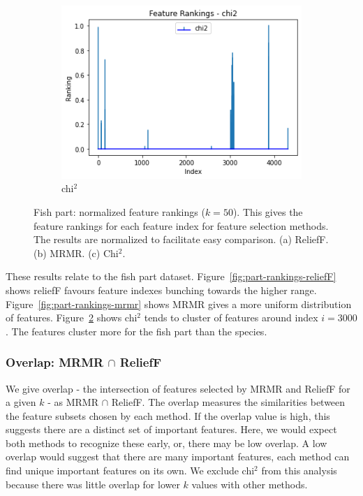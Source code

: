 \documentclass{article}
\begin{document}
\begin{figure}[htb]
  \begin{subfigure}[b]{\linewidth}
    \includegraphics[width=1\linewidth]{part_rankings_k-50_chi2.png}
    \caption{chi$^2$}
    \label{fig:part-rankings-chi2}
  \end{subfigure}

  \caption[Two numerical solutions]{
    Fish part: normalized feature rankings ($k=50$).
    This gives the feature rankings for each feature index for feature selection methods.
    The results are normalized to facilitate easy comparison.
    (a) ReliefF. (b) MRMR. (c) Chi$^2$.}
\end{figure}

These results relate to the fish part dataset.
Figure~\ref{fig:part-rankings-reliefF} shows reliefF favours feature indexes bunching towards the higher range.
Figure~\ref{fig:part-rankings-mrmr} shows MRMR gives a more uniform distribution of features.
Figure~\ref{fig:part-rankings-chi2} shows chi$^2$ tends to cluster of features around index $i = 3000$.
The features cluster more for the fish part than the species.

\subsubsection{Overlap: MRMR $\cap$ ReliefF}
\label{sec:results-visualisation-overlap-mrmr-reliefF}

We give overlap - the intersection of features selected by MRMR and ReliefF for a given $k$ - as MRMR $\cap$ ReliefF.
The overlap measures the similarities between the feature subsets chosen by each method.
If the overlap value is high, this suggests there are a distinct set of important features.
Here, we would expect both methods to recognize these early, or, there may be low overlap.
A low overlap would suggest that there are many important features, each method can find unique important features on its own.
We exclude chi$^2$ from this analysis because there was little overlap for lower $k$ values with other methods.
\end{document}

